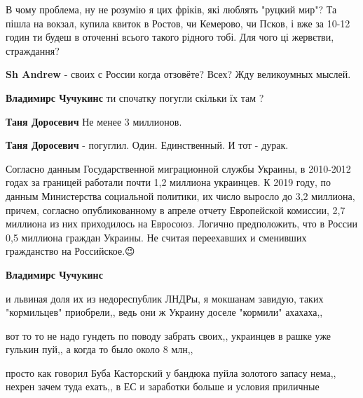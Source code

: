 \begin{itemize}
В чому проблема, ну не розумію я цих фріків, які люблять "руцкий мир"? Та пішла
на вокзал, купила квиток в Ростов, чи Кемерово, чи Псков, і вже за 10-12 годин
ти будеш в оточенні всього такого рідного тобі. Для чого ці жервєтви,
страждання?

\begin{itemize}

\textbf{Sh Andrew} - своих с России когда отзовёте? Всех? Жду великоумных мыслей.🤣


\textbf{Владимирс Чучукинс} ти спочатку погугли скільки їх там ?


\textbf{Таня Доросевич} Не менее 3 миллионов.


\textbf{Таня Доросевич} - погуглил. Один. Единственный. И тот - дурак.🤣

Согласно данным Государственной миграционной службы Украины, в 2010-2012 годах
за границей работали почти 1,2 миллиона украинцев. К 2019 году, по данным
Министерства социальной политики, их число выросло до 3,2 миллиона, причем,
согласно опубликованному в апреле отчету Европейской комиссии, 2,7 миллиона из
них приходилось на Евросоюз. Логично предположить, что в России 0,5 миллиона
граждан Украины. Не считая переехавших и сменивших гражданство на Российское.😉



\textbf{Владимирс Чучукинс} 

и львиная доля их из недореспублик ЛНДРы, я мокшанам завидую, таких
"кормильцев" приобрели,, ведь они ж Украину доселе "кормили" ахахаха,,

вот то то не надо гундеть по поводу забрать своих,, украинцев в рашке уже
гулькин пуй,, а когда то было около 8 млн,,

просто как говорил Буба Касторский у бандюка пуйла золотого запасу нема,,
нехрен зачем туда ехать,, в ЕС и заработки больше и условия приличные
\end{itemize}


\end{itemize}
